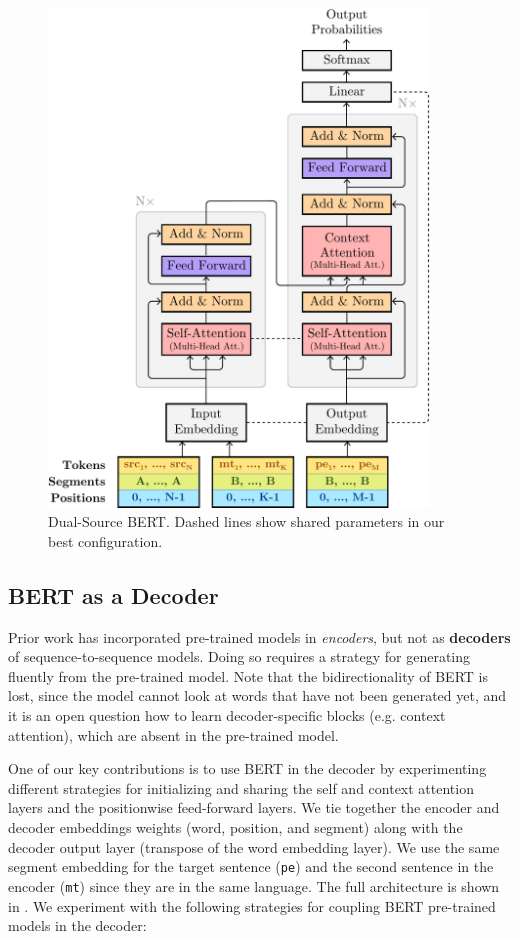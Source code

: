 \begin{figure}[ht!]
    \centering
    \includegraphics[width=0.9\textwidth]{Figures/bert-ape-diagram.pdf}
    \caption{Dual-Source BERT. Dashed lines show shared parameters in our best configuration.}
    \label{fig:transformer_diagram}
\end{figure}

\subsection{BERT as a Decoder}\label{sec:ape_bert_decoder}

Prior work has incorporated pre-trained models in {\it encoders}, but
not as {\bf decoders} of sequence-to-sequence models. Doing so
requires a strategy for generating fluently from the pre-trained
model. Note that the bidirectionality of BERT is lost, since the
model cannot look at words that have not been generated yet, and it
is an open question how to learn decoder-specific blocks (e.g.
context attention), which are absent in the pre-trained model.

One of our key contributions is to use BERT in the decoder by
experimenting different strategies for initializing and sharing the
self and context attention layers and the positionwise feed-forward
layers. We tie together the encoder and decoder embeddings weights
(word, position, and segment) along with the decoder output layer
(transpose of the word embedding layer). We use the same segment
embedding for the target sentence ({\tt pe}) and the second sentence
in the encoder ({\tt mt}) since they are in the same language. The
full architecture is shown in .
We experiment with the following strategies for coupling BERT
pre-trained models in the decoder:

